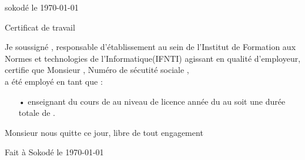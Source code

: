 \documentclass[12pt,a4paper]{article}
\begin{document}
\begin{flushright}
sokodé le \today \vspace{30mm}
\end{flushright}

\begin{center}
Certificat de travail \vspace{5mm}
\end{center}
\begin{flushleft}
Je soussigné \textbf{ }, responsable d'établissement au sein de l'Institut de Formation aux Normes et technologies de l'Informatique(IFNTI) agissant en qualité d'employeur, certifie que Monsieur \textbf{ }, Numéro de sécutité sociale ,\vspace{1mm} \\
a été employé en tant que : \vspace{2mm}
\begin{itemize}
\item[•] enseignant du cours de  au niveau de licence  année du  au  soit une durée totale de . \vspace{2mm}
\end{itemize}
Monsieur \textbf{ } nous quitte ce jour, libre de tout engagement

\end{flushleft}\vspace{6mm}

\begin{flushright}
Fait à Sokodé le \today
\end{flushright}\vspace{20mm}

\hfill
\begin{minipage}[t]{0.4\textwidth}
    \raggedright 
     
\end{minipage}
\end{document}
